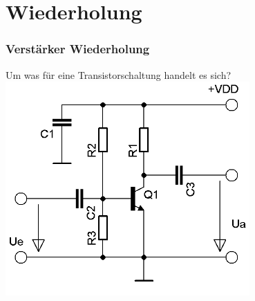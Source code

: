 

\subtitle{Technik A07: \\
           Oszillator und Hochfrequenzverstärker \\[2em]}
\date{Stand 01.06.2016}


\section*{Wiederholung}

\begin{frame}
    \frametitle{Verstärker Wiederholung}
    \begin{center}
    \large Um was für eine Transistorschaltung handelt es sich?
        \includegraphics[width=0.7\textwidth,height=.8\textheight,keepaspectratio]{a07/Transistor_Verstaerker_emetter.png}
	\end{center}
\end{frame}

